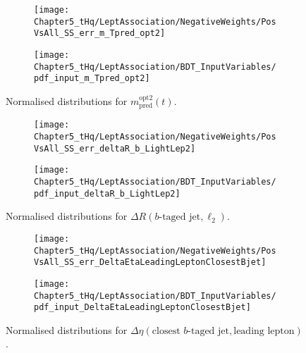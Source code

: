 \begin{figure}[h]
\centering
\begin{subfigure}{.46\textwidth}
  \centering
  \texttt{[image: Chapter5\_tHq/LeptAssociation/NegativeWeights/PosVsAll\_SS\_err\_m\_Tpred\_opt2]}
\end{subfigure}%
\begin{subfigure}{.46\textwidth}
  \centering
  \texttt{[image: Chapter5\_tHq/LeptAssociation/BDT\_InputVariables/pdf\_input\_m\_Tpred\_opt2]}
\end{subfigure}
\caption{Normalised distributions for $m^{\text{opt2}}_{\text{pred}}(t)$.}
\label{fig:Appendix:BDTVARS:LeptonAssignment:m_Tpred_opt2}
\end{figure}

\begin{figure}[h]
\centering
\begin{subfigure}{.46\textwidth}
  \centering
  \texttt{[image: Chapter5\_tHq/LeptAssociation/NegativeWeights/PosVsAll\_SS\_err\_deltaR\_b\_LightLep2]}
\end{subfigure}%
\begin{subfigure}{.46\textwidth}
  \centering
  \texttt{[image: Chapter5\_tHq/LeptAssociation/BDT\_InputVariables/pdf\_input\_deltaR\_b\_LightLep2]}
\end{subfigure}
\caption{Normalised distributions for $\Delta R(b\text{-taged jet}, \ell_{2})$.}
\label{fig:Appendix:BDTVARS:LeptonAssignment:deltaR_b_LightLep2}
\end{figure}

\begin{figure}[h]
\centering
\begin{subfigure}{.46\textwidth}
  \centering
  \texttt{[image: Chapter5\_tHq/LeptAssociation/NegativeWeights/PosVsAll\_SS\_err\_DeltaEtaLeadingLeptonClosestBjet]}
\end{subfigure}%
\begin{subfigure}{.46\textwidth}
  \centering
  \texttt{[image: Chapter5\_tHq/LeptAssociation/BDT\_InputVariables/pdf\_input\_DeltaEtaLeadingLeptonClosestBjet]}
\end{subfigure}
\caption{Normalised distributions for $\Delta \eta(\text{closest }b\text{-taged jet}, \text{leading lepton})$.}
\label{fig:Appendix:BDTVARS:LeptonAssignment:DeltaEtaLeadingLeptonClosestBjet}
\end{figure}




